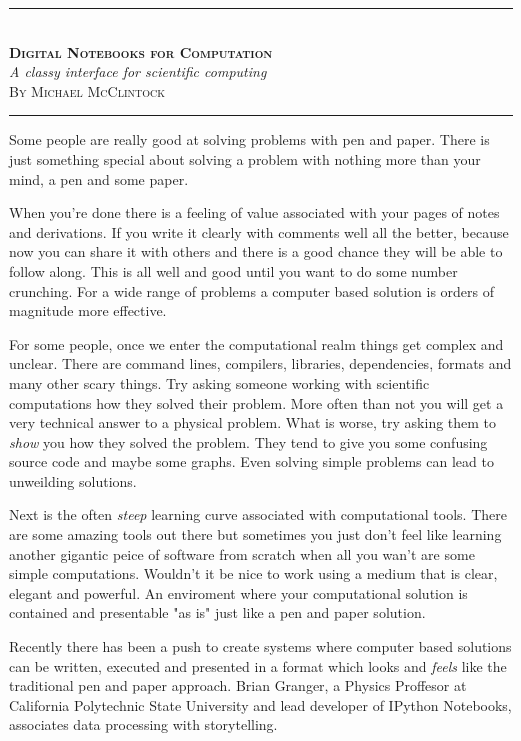 \documentclass[11pt, a4paper]{article}  %
\begin{document}
\begin{center}
    \rule[0.5ex]{1\columnwidth}{1pt}
    \\[4mm]
    \textbf{\textsc{\Huge Digital Notebooks for Computation}}
    \\[6mm]
    \textit{\Large A classy interface for scientific computing}
    \\[6mm]
    \textsc{\large By Michael McClintock}
    \\[4mm]
    \rule[0.5ex]{1\columnwidth}{1pt}
\end{center}

\begin{multicols}{2}

Some people are really good at solving problems with pen and paper. There is
just something special about solving a problem with nothing more than your
mind, a pen and some paper.

When you're done there is a feeling of value associated with your pages of
notes and derivations. If you write it clearly with comments well all the
better, because now you can share it with others and there is a good chance
they will be able to follow along. This is all well and good until you want to
do some number crunching. For a wide range of problems a computer based
solution is orders of magnitude more effective.

For some people, once we enter the computational realm things get complex and
unclear. There are command lines, compilers, libraries, dependencies, formats
and many other scary things. Try asking someone working with scientific
computations how they solved their problem. More often than not you will get a
very technical answer to a physical problem. What is worse, try asking them to
\emph{show} you how they solved the problem. They tend to give you some
confusing source code and maybe some graphs. Even solving simple problems can
lead to unweilding solutions.

Next is the often \emph{steep} learning curve associated with computational
tools. There are some amazing tools out there but sometimes you just don't
feel like learning another gigantic peice of software from scratch when all
you wan't are some simple computations. Wouldn't it be nice to work using a
medium that is clear, elegant and powerful. An enviroment where your
computational solution is contained and presentable "as is" just like a pen
and paper solution.

Recently there has been a push to create systems where computer based
solutions can be written, executed and presented in a format which looks and
\emph{feels} like the traditional pen and paper approach. Brian Granger, a
Physics Proffesor at California Polytechnic State University and lead
developer of IPython Notebooks, associates data processing with storytelling.


\end{multicols}
\end{document}
